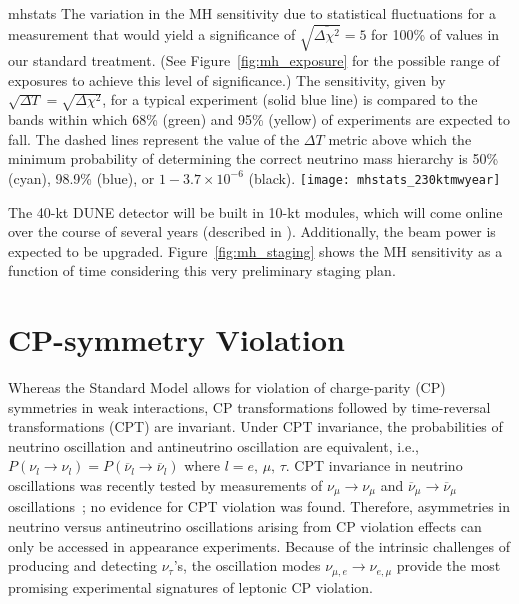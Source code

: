 \begin{cdrfigure}{mhstats}{
  The variation in the MH sensitivity due to statistical fluctuations for a measurement that would yield a significance of $\sqrt{\overline{\Delta\chi^{2}}} = 5$ for 100\% of \deltacp values in our standard treatment. (See Figure~\ref{fig:mh_exposure} for the possible range of exposures to achieve this level of significance.)  The 
  sensitivity, given by  $\sqrt{\Delta T}=\sqrt{\Delta\chi^2}$, for a typical experiment 
  (solid blue line) is compared to the bands within which
  68\% (green) and 95\% (yellow) of experiments are expected to fall. The dashed lines
  represent the value of the $\Delta T$ metric above which the minimum
  probability of determining
  the correct neutrino mass hierarchy is 50\%(cyan), 98.9\% (blue), or $1 - 3.7\times10^{-6}$
  (black). }
 \texttt{[image: mhstats\_230ktmwyear]}
\end{cdrfigure}

The 40-kt DUNE detector will be built in 10-kt modules, which will come online over the course of several years (described in \voldune).  Additionally, the beam power is expected to be upgraded. Figure~\ref{fig:mh_staging} shows the MH sensitivity as a function of time considering this very preliminary staging plan. 



\section{CP-symmetry Violation}
\label{sec:physics-lbnosc-cpv}

Whereas the Standard Model allows for violation of charge-parity (CP) symmetries in weak interactions, 
CP transformations followed by time-reversal transformations (CPT) are invariant. 
Under CPT invariance, the probabilities of neutrino oscillation and antineutrino oscillation
are equivalent, i.e., $P(\nu_l \rightarrow \nu_l) =
P(\overline{\nu}_l\rightarrow \overline{\nu}_l)$
where $l = e,\, \mu,\, \tau$. CPT invariance in neutrino oscillations was recently
 tested by measurements of $\nu_\mu
\rightarrow \nu_\mu$ and $\overline{\nu}_\mu \rightarrow \overline{\nu}_\mu$
oscillations~\cite{Adamson:2013whj}; no evidence for CPT
violation was found.  Therefore, asymmetries in neutrino versus antineutrino
oscillations arising from CP violation effects can only be accessed in
appearance experiments.  Because of the intrinsic challenges of
producing and detecting $\nu_\tau$'s, the oscillation modes
$\nu_{\mu,e} \rightarrow \nu_{e,\mu}$ provide the most promising
experimental signatures of leptonic CP violation.

